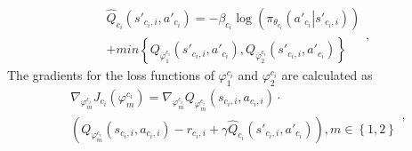\documentclass[lettersize,journal,onecolumn]{IEEEtran}
\begin{document}
\begin{equation}
\begin{aligned}
& {{\hat{Q}}_{{{c}_{i}}}}\left( {{{{s}'}}_{{{c}_{i}},i}},{{{{a}'}}_{{{c}_{i}}}} \right) =-{{\beta }_{{{c}_{i}}}}\log \left( {{\pi }_{{{\theta }_{{{c}_{i}}}}}}\left( {{{{a}'}}_{{{c}_{i}}}}\left| {{{{s}'}}_{{{c}_{i}},i}} \right. \right) \right) \\
& +min\left\{ {{Q}_{\bar{\varphi }_{1}^{{{c}_{i}}}}}\left( {{{{s}'}}_{{{c}_{i}},i}},{{{{a}'}}_{{{c}_{i}}}} \right),{{Q}_{\bar{\varphi }_{2}^{{{c}_{i}}}}}\left( {{{{s}'}}_{{{c}_{i}},i}},{{{{a}'}}_{{{c}_{i}}}} \right) \right\}{ } 
\end{aligned}
\label{eq31},	
\end{equation}
The gradients for the loss functions of $\varphi _{1}^{{{c}_{i}}}$ and $\varphi _{2}^{{{c}_{i}}}$ are calculated as
\begin{equation}
\begin{aligned}
& {{\nabla }_{\varphi _{m}^{{{c}_{i}}}}}{{J}_{{{c}_{i}}}}\left( \varphi _{m}^{{{c}_{i}}} \right){ }={{\nabla }_{\varphi _{m}^{{{c}_{i}}}}}{{Q}_{\varphi _{m}^{{{c}_{i}}}}}\left( {{s}_{{{c}_{i}},i}},{{a}_{{{c}_{i}},i}} \right)\cdot \\
& \left( {{Q}_{\varphi _{m}^{{{c}_{i}}}}}\left( {{s}_{{{c}_{i}},i}},{{a}_{{{c}_{i}},i}} \right)-{{r}_{{{c}_{i}},i}}+\gamma {{{\hat{Q}}}_{{{c}_{i}}}}\left( {{{{s}'}}_{{{c}_{i}},i}},{{{{a}'}}_{{{c}_{i}}}} \right) \right), m \in \left\{ 1,2\right\}  
\end{aligned}
\label{eq32},	
\end{equation} 
\end{document}
